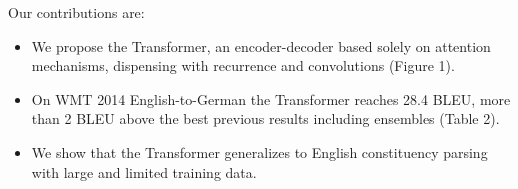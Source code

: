 Our contributions are:

\begin{itemize}
\item We propose the Transformer, an encoder-decoder based solely on attention mechanisms, dispensing with recurrence and convolutions  (Figure 1).
\item On WMT 2014 English-to-German the Transformer reaches 28.4 BLEU, more than 2 BLEU above the best previous results including ensembles  (Table 2).
\item We show that the Transformer generalizes to English constituency parsing with large and limited training data.
\end{itemize}
